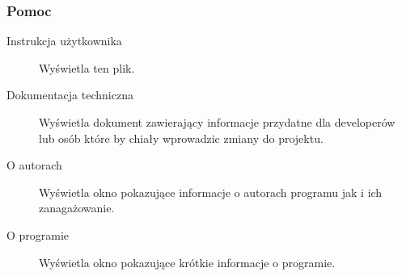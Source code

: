 \documentclass[a4paper,10pt]{article}
\begin{document}
\newpage
\subsubsection{Pomoc}
\begin{description}
\item [Instrukcja użytkownika] Wyświetla ten plik.
\item [Dokumentacja techniczna] Wyświetla dokument zawierający informacje przydatne dla developerów lub osób które by chiały wprowadzic zmiany do projektu.
\item [O autorach] Wyświetla okno pokazujące informacje o autorach programu jak i ich zanagażowanie.
\item [O programie] Wyświetla okno pokazujące krótkie informacje o programie.
\end{description}
\end{document}

